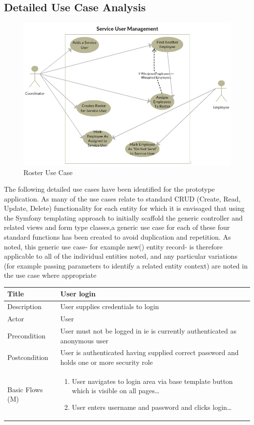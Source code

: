 \documentclass[a4paper,12pt]{article}
\newcommand\addrow[2]{#1 &#2\\ }
\newcommand\addheading[2]{#1 &#2\\ \hline}
\newcommand\tabularhead{\begin{tabular}{lp{11cm}}
\hline
}
\newcommand\addmulrow[2]{ \begin{minipage}[t][][t]{3cm}#1\end{minipage}%
   &\begin{minipage}[t][][t]{11cm}
    \begin{enumerate} #2   \end{enumerate}
    \end{minipage}\\ }
\newenvironment{usecase}{\tabularhead}
{\hline\end{tabular}}
\begin{document}
\begin{samepage}
\subsection {Detailed Use Case Analysis}
 \begin{figure}[h!]
  \includegraphics[scale=0.8]{rosterusecase.jpg}
  \caption{Roster Use Case}
  \label{fig:roster use case}
\end{figure}
The following detailed use cases have been identified for the prototype application. As many of the use cases relate to standard CRUD (Create, Read, Update, Delete) functionality for each entity for which it is envisaged that using the Symfony templating approach to initially scaffold the generic controller and related views and form type classes,a generic use case for each of these four standard functions has been created to avoid duplication and repetition. As noted, this generic use case- for example new() entity record- is therefore applicable to all of the individual entities noted, and any particular variations (for example passing parameters to identify a related entity context) are noted in the use case where appropriate
\newpage
\begin{usecase}
  \addheading{Title}{User login}
  \addheading{Description}{User supplies credentials to login}
  \addheading{Actor}{User} 
  \addrow{Precondition}{User must not be logged in ie is currently authenticated as anonymous user}
  \addrow{Postcondition}{User is authenticated having supplied correct password and holds one or more security role}
  \addmulrow{Basic Flows (M)}{\item User navigates to login area via base template button which is visible on all pages\ldots
                                  \item User enters username and password and clicks login\ldots
}
\end{usecase}
\end{samepage}
\end{document}
